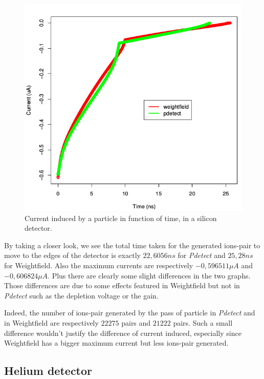 \documentclass[11pt]{article}
\begin{document}
			\begin{figure}[H]
			  \center
			  \includegraphics[scale=0.5]{images/applications/silicon_current.png}
			  \caption{Current induced by a particle in function of time, in a silicon detector.}
			  \label{fig:silicon}
			\end{figure}

			By taking a closer look, we see the total time taken for the generated ions-pair to move to the edges of the
			detector is exactly $22,6056ns$ for \textit{Pdetect} and $25,28ns$ for Weightfield. Also the maximum
			currents are respectively $-0,596511\mu A$ and $-0,606824\mu A$. Plus there are clearly some slight
			differences in the two graphs. Those differences are due to some effects featured in Weightfield
			but not in \textit{Pdetect} such as the depletion voltage or the gain.

			Indeed, the number of ions-pair generated by the pass of particle in \textit{Pdetect} and in Weightfield
			are respectively $22275$ pairs and $21222$ pairs. Such a small difference wouldn't justify the difference
			of current induced, especially since Weightfield has a bigger maximum current but less ions-pair generated.

	\subsection{Helium detector}
\end{document}
